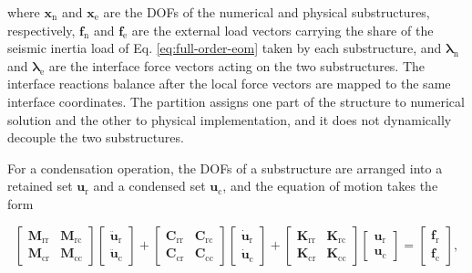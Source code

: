 \documentclass[a4paper,fleqn,review,12pt]{cas-sc}
\begin{document}
\noindent where \(\bm{x}_{\mathrm{n}}\) and \(\bm{x}_{\mathrm{e}}\) are the DOFs of the numerical and physical substructures, respectively, \(\bm{f}_{\mathrm{n}}\) and \(\bm{f}_{\mathrm{e}}\) are the external load vectors carrying the share of the seismic inertia load of Eq. \eqref{eq:full-order-eom} taken by each substructure, and \(\bm{\lambda}_{\mathrm{n}}\) and \(\bm{\lambda}_{\mathrm{e}}\) are the interface force vectors acting on the two substructures. 
{The interface reactions balance after the local force vectors are mapped to the same interface coordinates.} The partition assigns one part of the structure to numerical solution and the other to physical implementation, and it does not dynamically decouple the two substructures.

For a condensation operation, the DOFs of a substructure are arranged into a retained set \(\bm{u}_{\mathrm{r}}\) and a condensed set \(\bm{u}_{\mathrm{c}}\), and the equation of motion takes the form

\vspace{-3.5em}
\begin{equation}
	\begin{bmatrix}
		\mathbf{M}_{\mathrm{rr}} & \mathbf{M}_{\mathrm{rc}}\\
		\mathbf{M}_{\mathrm{cr}} & \mathbf{M}_{\mathrm{cc}}
	\end{bmatrix}
	\begin{bmatrix}
		\ddot{\bm{u}}_{\mathrm{r}}\\
		\ddot{\bm{u}}_{\mathrm{c}}
	\end{bmatrix}
	+
	\begin{bmatrix}
		\mathbf{C}_{\mathrm{rr}} & \mathbf{C}_{\mathrm{rc}}\\
		\mathbf{C}_{\mathrm{cr}} & \mathbf{C}_{\mathrm{cc}}
	\end{bmatrix}
	\begin{bmatrix}
		\dot{\bm{u}}_{\mathrm{r}}\\
		\dot{\bm{u}}_{\mathrm{c}}
	\end{bmatrix}
	+
	\begin{bmatrix}
		\mathbf{K}_{\mathrm{rr}} & \mathbf{K}_{\mathrm{rc}}\\
		\mathbf{K}_{\mathrm{cr}} & \mathbf{K}_{\mathrm{cc}}
	\end{bmatrix}
	\begin{bmatrix}
		\bm{u}_{\mathrm{r}}\\
		\bm{u}_{\mathrm{c}}
	\end{bmatrix}
	=
	\begin{bmatrix}
		\bm{f}_{\mathrm{r}}\\
		\bm{f}_{\mathrm{c}}
	\end{bmatrix},
	\label{eq:partitioned-local-eom}
\end{equation}
\vspace{-2.5em}
\end{document}
